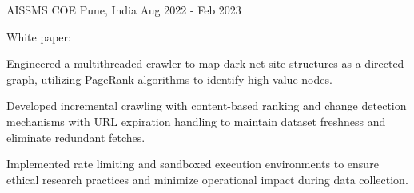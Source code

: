 \begin{cventries}
  \cventry
    {AISSMS COE} %
    {} %
    {Pune, India} %
    {Aug 2022 - Feb 2023} %
    {
      \begin{cvitems} %
        \item {White paper: }
        \item {Engineered a multithreaded crawler to map dark-net site structures as a directed graph, utilizing PageRank algorithms to identify high-value nodes.}
        \item {Developed incremental crawling with content-based ranking and change detection mechanisms with URL expiration handling to maintain dataset freshness and eliminate redundant fetches.}
        \item {Implemented rate limiting and sandboxed execution environments to ensure ethical research practices and minimize operational impact during data collection.}
      \end{cvitems}
    }
\else\fi



\end{cventries}
